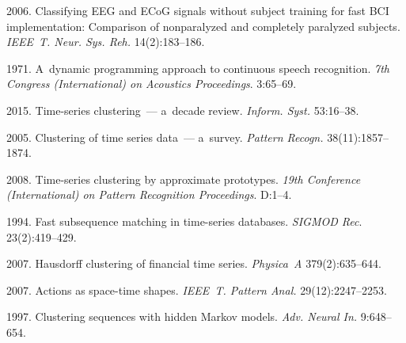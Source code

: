   \begin{multicols}{2}

\renewcommand{\bibname}{\protect\rmfamily References}

{\small\frenchspacing
 {%
 \begin{thebibliography}{99}

 2006. Classifying EEG and ECoG signals without subject 
training for fast BCI implementation: Comparison of nonparalyzed and completely 
paralyzed subjects. \textit{IEEE~T. Neur. Sys. 
Reh.} 14(2):183--186.

 1971. A~dynamic programming approach 
to continuous speech recognition. \textit{7th 
 Congress (International) on Acoustics Proceedings}. 3:65--69.

 2015. 
Time-series clustering~--- a~decade review.  \textit{Inform. Syst.} 
53:16--38.

 2005. Clustering of time series data~--- a~survey. 
\textit{Pattern Recogn.}
38(11):1857--1874.



 2008. 
Time-series clustering by approximate prototypes. 
 \textit{19th  Conference (International) on Pattern Recognition Proceedings}. 
 D:1--4.

 1994. 
Fast subsequence matching in time-series databases.  \textit{SIGMOD Rec}. 
23(2):419--429.

2007. Hausdorff clustering of financial time series. 
\textit{Physica~A} 379(2):635--644.

2007. Actions as space-time shapes.
\textit{IEEE~T. Pattern Anal.} 29(12):2247--2253.

 1997. 
Clustering sequences with hidden Markov models. \textit{Adv. Neural In.} 9:648--654.


\end{thebibliography}}}
\end{multicols}

